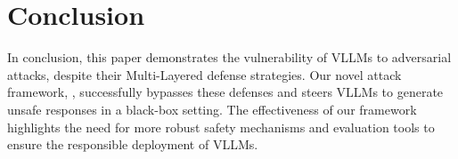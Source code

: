 \section{Conclusion}
In conclusion, this paper demonstrates the vulnerability of VLLMs to adversarial attacks, despite their Multi-Layered defense strategies. Our novel attack framework, \textbf{\mfa}, successfully bypasses these defenses and steers VLLMs to generate unsafe responses in a black-box setting. The effectiveness of our framework highlights the need for more robust safety mechanisms and evaluation tools to ensure the responsible deployment of VLLMs. 

